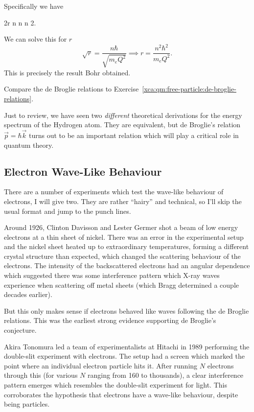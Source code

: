 Specifically we have
\begin{calculation}
2\pi r
n 
n 
n 2\pi\hbar{}.
\end{calculation}
We can solve this for $r$
\begin{equation}
  \sqrt{r} = \frac{n\hbar}{\sqrt{m_{e}Q^{2}}}\implies
r = \frac{n^{2}\hbar^{2}}{m_{e}Q^{2}}.
\end{equation}
This is precisely the result Bohr obtained.

\begin{remark}
Compare the de Broglie relations to Exercise~\ref{xca:qm:free-particle:de-broglie-relations}.
\end{remark}

\begin{remark}
Just to review, we have seen two \emph{different} theoretical
derivations for the energy spectrum of the Hydrogen atom. They are
equivalent, but de Broglie's relation $\vec{p}=\hbar\vec{k}$ turns out
to be an important relation which will play a critical role in quantum
theory. 
\end{remark}

\subsection{Electron Wave-Like Behaviour}

\M
There are a number of experiments which test the wave-like behaviour of
electrons, I will give two. They are rather ``hairy'' and technical, so
I'll skip the usual format and jump to the punch lines.

Around 1926,
Clinton Davisson and Lester Germer shot a beam of low energy electrons
at a thin sheet of nickel. There was an error in the experimental setup
and the nickel sheet heated up to extraordinary temperatures, forming a
different crystal structure than expected, which changed the scattering
behaviour of the electrons. The intensity of the backscattered electrons
had an angular dependence which suggested there was some interference
pattern which X-ray waves experience when scattering off metal sheets
(which Bragg determined a couple decades earlier).

But this only makes sense if electrons behaved like waves following the
de Broglie relations. This was the earliest strong evidence supporting
de Broglie's conjecture.

Akira Tonomura led a team of experimentalists at Hitachi in 1989
performing the double-slit experiment with electrons. The setup had a
screen which marked the point where an individual electron particle hits
it. After running $N$ electrons through this (for various $N$ ranging
from 160 to thousands), a clear interference pattern emerges which
resembles the double-slit experiment for light. This corroborates the
hypothesis that electrons have a wave-like behaviour, despite being
particles. 
